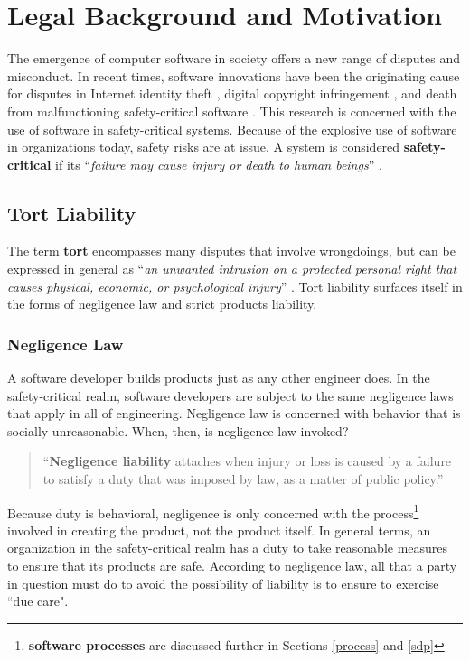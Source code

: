 \section{Legal Background and Motivation}\label{legal}
The emergence of computer software in society offers a new range of disputes and
misconduct. In recent times, software innovations have been the originating
cause for disputes in Internet identity theft \cite{Valetk2004}, digital
copyright infringement \cite{Manesh2006}, and death from malfunctioning
safety-critical software \cite{Leveson1993}. This research is concerned with the
use of software in safety-critical systems. Because of the explosive use of
software in organizations today, safety risks are at issue. A system is 
considered \textbf{safety-critical} if its ``\textit{failure may cause injury or
death to human beings}'' \cite{FOLDOC}.

\subsection{Tort Liability}
The term \textbf{tort} encompasses many disputes that involve wrongdoings, but 
can be expressed in general as ``\textit{an unwanted intrusion on a protected
personal right that causes physical, economic, or psychological injury}'' 
\cite{Burgunder2004}. Tort liability surfaces itself in the forms of negligence
law and strict products liability.

\subsubsection{Negligence Law}
A software developer builds products just as any other engineer does. In the
safety-critical realm, software developers are subject to the same negligence
laws that apply in all of engineering. Negligence law is concerned with behavior
that is socially unreasonable. When, then, is negligence law invoked?

\begin{quote}
``\textbf{Negligence liability} attaches when injury or loss is caused by a 
failure to satisfy a duty that was imposed by law, as a matter of public
policy.'' \cite{Kaner_neg_1995}
\end{quote}

Because duty is behavioral, negligence is only concerned with the
process\footnote{\textbf{software processes} are discussed further in
Sections \ref{process} and \ref{sdp}} involved in creating the product, not the
product itself. In general terms, an organization in the safety-critical realm
has a duty to take reasonable measures to ensure that its products are safe.
According to negligence law, all that a party in question must do to avoid the 
possibility of liability is to ensure to exercise ``due care".

